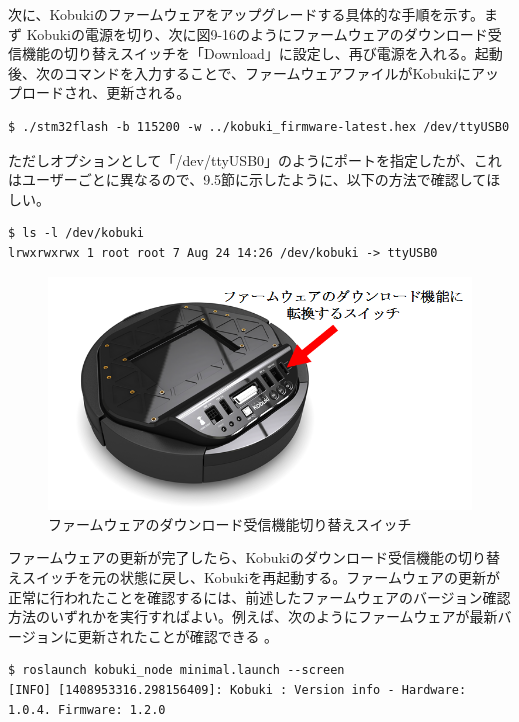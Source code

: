 \begin{itemize}
次に、Kobukiのファームウェアをアップグレードする具体的な手順を示す。まず   Kobukiの電源を切り、次に図9-16のようにファームウェアのダウンロード受信機能の切り替えスイッチを「Download」に設定し、再び電源を入れる。起動後、次のコマンドを入力することで、ファームウェアファイルがKobukiにアップロードされ、更新される。

\begin{lstlisting}[language=ROS]
$ ./stm32flash -b 115200 -w ../kobuki_firmware-latest.hex /dev/ttyUSB0
\end{lstlisting}

ただしオプションとして「/dev/ttyUSB0」のようにポートを指定したが、これはユーザーごとに異なるので、9.5節に示したように、以下の方法で確認してほしい。

\begin{lstlisting}[language=ROS]
$ ls -l /dev/kobuki
lrwxrwxrwx 1 root root 7 Aug 24 14:26 /dev/kobuki -> ttyUSB0
\end{lstlisting}

\begin{figure}[ht]
  \centering
  \includegraphics[width=\columnwidth]{pictures/chapter9/pic_09_16.png}
  \caption{ファームウェアのダウンロード受信機能切り替えスイッチ}
\end{figure}

ファームウェアの更新が完了したら、Kobukiのダウンロード受信機能の切り替えスイッチを元の状態に戻し、Kobukiを再起動する。ファームウェアの更新が正常に行われたことを確認するには、前述したファームウェアのバージョン確認方法のいずれかを実行すればよい。例えば、次のようにファームウェアが最新バージョンに更新されたことが確認できる  。

\begin{lstlisting}[language=ROS]
$ roslaunch kobuki_node minimal.launch --screen
[INFO] [1408953316.298156409]: Kobuki : Version info - Hardware: 1.0.4. Firmware: 1.2.0
\end{lstlisting}


\end{itemize}
